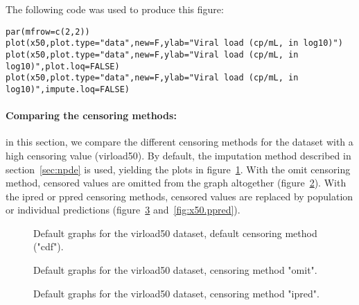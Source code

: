 The following code was used to produce this figure:
\begin{verbatim}
par(mfrow=c(2,2))
plot(x50,plot.type="data",new=F,ylab="Viral load (cp/mL, in log10)")
plot(x50,plot.type="data",new=F,ylab="Viral load (cp/mL, in log10)",plot.loq=FALSE)
plot(x50,plot.type="data",new=F,ylab="Viral load (cp/mL, in log10)",impute.loq=FALSE)
\end{verbatim} 

\paragraph{Comparing the censoring methods:} in this section, we compare the different censoring methods for the dataset with a high censoring value (virload50). By default, the imputation method described in section~\ref{sec:npde} is used, yielding the plots in figure~\ref{fig:x50.cdf}. With the {\sf omit} censoring method, censored values are omitted from the graph altogether (figure~\ref{fig:x50.omit}). With the {\sf ipred} or {\sf ppred} censoring methods, censored values are replaced by population or individual predictions (figure~\ref{fig:x50.ipred} and~\ref{fig:x50.ppred}).

\begin{figure}[!h]
\par\kern -0.3cm
\begin{center}
\end{center}
\par\kern -0.3cm
\caption{Default graphs for the virload50 dataset, default censoring method ({\sf "cdf"}).}\label{fig:x50.cdf}
\end{figure}

\begin{figure}[!h]
\par\kern -0.5cm
\begin{center}
\end{center}
\par\kern -0.5cm
\caption{Default graphs for the virload50 dataset, censoring method {\sf "omit"}.}\label{fig:x50.omit}
\end{figure}

\begin{figure}[!h]
\par\kern -0.5cm
\begin{center}
\end{center}
\par\kern -0.5cm
\caption{Default graphs for the virload50 dataset, censoring method {\sf "ipred"}.}\label{fig:x50.ipred}
\end{figure}

